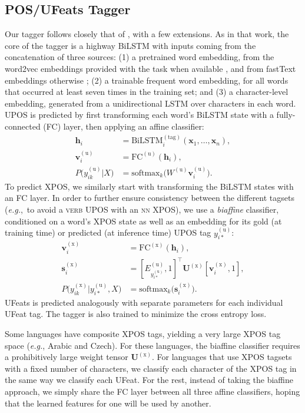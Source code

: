 \documentclass[11pt,a4paper]{article}
\begin{document}
\subsection{POS/UFeats Tagger}
Our tagger follows closely that of \cite{dozat-qi-manning:2017:K17-3}, with a few extensions. As in that work, the core of the tagger is a highway BiLSTM \cite{srivastava2015highway} with inputs coming from the concatenation of three sources: (1) a pretrained word embedding, from the word2vec embeddings provided with the task when available \citep{mikolov2013distributed}, and from fastText embeddings otherwise \citep{bojanowski2016enriching}; (2) a trainable frequent word embedding, for all words that occurred at least seven times in the training set; and (3) a character-level embedding, generated from a unidirectional LSTM over characters in each word. UPOS is predicted by first transforming each word's BiLSTM state with a fully-connected (FC) layer, then applying an affine classifier:
\begin{align}
  \mathbf{h}_i &= \text{BiLSTM}_i^{(\text{tag})}(\mathbf{x}_1, \ldots, \mathbf{x}_n) ,\\
  \mathbf{v}^{(\text{u})}_i &= \text{FC}^{(\text{u})}(\mathbf{h}_i) ,\\
P\big(y^{(\text{u})}_{ik} | X\big) &= \text{softmax}_k\big(W^{(\text{u})}\mathbf{v}^{(\text{u})}_i \big) .
\end{align}
To predict XPOS, we similarly start with transforming the BiLSTM states with an FC layer. In order to further ensure consistency between the different tagsets (\emph{e.g.},\ to avoid a \textsc{verb} UPOS with an \textsc{nn} XPOS), we use a \emph{biaffine} classifier, conditioned on a word's XPOS state as well as an embedding for its gold (at training time) or predicted (at inference time) UPOS tag $y_{i*}^{(\text{u})}$:
\begin{align}
  \mathbf{v}^{(\text{x})}_i &= \text{FC}^{(\text{x})}(\mathbf{h}_i) ,\\
\mathbf{s}^{(\text{x})}_i &= [E^{(\text{u})}_{y_{i*}^{(\text{u})}} , 1]^\top \mathbf{U}^{(\text{x})}[\mathbf{v}^{(\text{x})}_i, 1] ,\\
  P\big(y_{ik}^{(\text{x})} | y_{i*}^{(\text{u})}, X\big) &= \text{softmax}_k\big(\mathbf{s}^{(\text{x})}_i\big) .
\end{align}
UFeats is predicted analogously with separate parameters for each individual UFeat tag. The tagger is also trained to minimize the cross entropy loss.

Some languages have composite XPOS tags, yielding a very large XPOS tag space
(\emph{e.g.}, Arabic and Czech).
For these languages, the biaffine classifier requires a prohibitively large weight tensor $\mathbf{U}^{(\text{x})}$.
For languages that use XPOS tagsets with a fixed number of characters, we classify each character of the XPOS tag in the same way we classify each UFeat.
For the rest, instead of taking the biaffine approach, we simply share the FC layer between all three affine classifiers, hoping that the learned features for one will be used by another.
\end{document}
